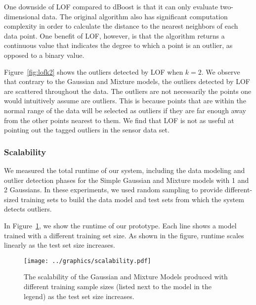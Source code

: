 One downside of LOF compared to dBoost is that it can only evaluate two-dimensional data.
The original algorithm also has significant computation complexity in order to calculate the distance to the nearest neighbors of each data point.
One benefit of LOF, however, is that the algorithm returns a continuous value that indicates the degree to which a point is an outlier, as opposed to a binary value.

Figure~\ref{fig:lofk2} shows the outliers detected by LOF when $k=2$.
We observe that contrary to the Gaussian and Mixture models, the outliers detected by LOF are scattered throughout the data.
The outliers are not necessarily the points one would intuitively assume are outliers.
This is because points that are within the normal range of the data will be selected as outliers if they are far enough away from the other points nearest to them.
We find that LOF is not as useful at pointing out the tagged outliers in the sensor data set.

\subsubsection{Scalability}

We measured the total runtime of our system, including the data modeling and outlier detection phases for the Simple Gaussian and Mixture models with 1 and 2 Gaussians. In these experiments, we used random sampling to provide different-sized training sets to build the data model and test sets from which the system detects outliers.

In Figure~\ref{fig:scaling}, we show the runtime of our prototype. Each line shows a model trained with a different training set size. As shown in the figure, runtime scales linearly as the test set size increases.

\begin{figure}
\centering
\texttt{[image: ../graphics/scalability.pdf]}
\caption{The scalability of the Gaussian and Mixture Models produced with different training sample sizes (listed next to the model in the legend) as the test set size increases.}
\label{fig:scaling}
\end{figure}
